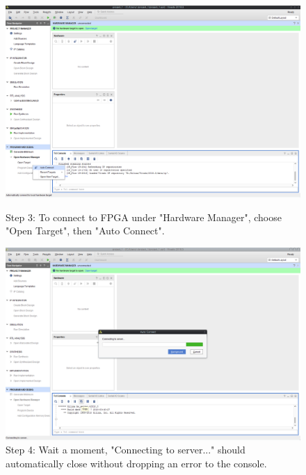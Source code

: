 \begin{figure}[H]
  \centering
  \includegraphics[width=0.8\linewidth]{images/vivado03.png}
  \captionsetup{width=0.8\linewidth}
  \caption{Step 3: To connect to FPGA
           under "Hardware Manager", choose "Open Target", then "Auto Connect".}
  \label{fig:vivado03}

\vspace{5mm}

  \includegraphics[width=0.8\linewidth]{images/vivado04.png}
  \captionsetup{width=0.8\linewidth}
  \caption{Step 4: Wait a moment, "Connecting to server..."  should
           automatically close without dropping an error to the console.}
  \label{fig:vivado04}
\end{figure}


